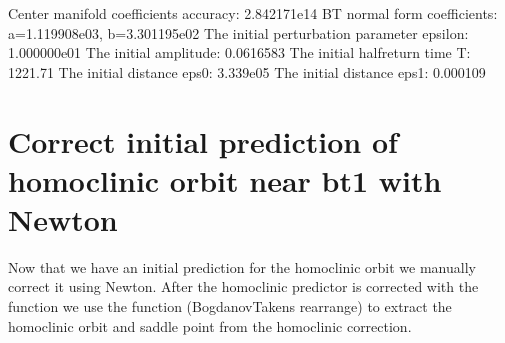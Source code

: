 \documentclass[letterpaper,10pt,english]{jupyterBook}
\begin{document}
\begin{sphinxVerbatim}[commandchars=\\\{\}]
\PYG{p}{[}\PYG{p}{]}
\end{sphinxVerbatim}

\begin{sphinxVerbatim}[commandchars=\\\{\}]
Center manifold coefficients\PYGZsq{} accuracy: 2.842171e\PYGZhy{}14
BT normal form coefficients:
a=\PYGZhy{}1.119908e\PYGZhy{}03,	 b=\PYGZhy{}3.301195e\PYGZhy{}02
The initial perturbation parameter epsilon:  1.000000e\PYGZhy{}01
The initial amplitude: 0.0616583
The initial half\PYGZhy{}return time T: 1221.71
The initial distance eps0: 3.339e\PYGZhy{}05
The initial distance eps1: 0.000109
\end{sphinxVerbatim}


\section{Correct initial prediction of homoclinic orbit near bt1 with Newton}
\label{\detokenize{Morris-Lecar:correct-initial-prediction-of-homoclinic-orbit-near-bt1-with-newton}}
\sphinxAtStartPar
Now that we have an initial prediction for the homoclinic orbit we
manually correct it using Newton. After the homoclinic predictor is corrected
with the  function  we use the function 
(Bogdanov\sphinxhyphen{}Takens rearrange) to extract the homoclinic orbit and saddle point
from the homoclinic correction.
\end{document}
